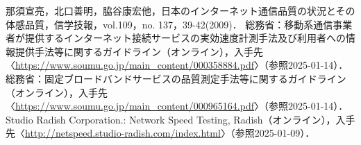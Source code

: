 \begin{thebibliography}{99}
     那須宣亮，北口善明，脇谷康宏他，日本のインターネット通信品質の状況とその体感品質，信学技報，vol.109，no. 137，39-42(2009)． %
     総務省：移動系通信事業者が提供するインターネット接続サービスの実効速度計測手法及び利用者への情報提供手法等に関するガイドライン（オンライン），入手先〈\url{https://www.soumu.go.jp/main_content/000358884.pdf}〉（参照2025-01-14）． %
     総務省：固定ブロードバンドサービスの品質測定手法等に関するガイドライン（オンライン），入手先〈\url{https://www.soumu.go.jp/main_content/000965164.pdf}〉（参照2025-01-14）． %
    Studio Radish Corporation.: Network Speed Testing, Radish（オンライン），入手先〈\url{http://netspeed.studio-radish.com/index.html}〉（参照2025-01-09）． %
\end{thebibliography}
